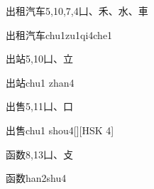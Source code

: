 \begin{entry}{出租汽车}{5,10,7,4}{⼐、⽲、⽔、⾞}
  \begin{phonetics}{出租汽车}{chu1zu1qi4che1}
  \end{phonetics}
\end{entry}

\begin{entry}{出站}{5,10}{⼐、⽴}
  \begin{phonetics}{出站}{chu1 zhan4}
  \end{phonetics}
\end{entry}

\begin{entry}{出售}{5,11}{⼐、⼝}
  \begin{phonetics}{出售}{chu1 shou4}[][HSK 4]
  \end{phonetics}
\end{entry}

\begin{entry}{函数}{8,13}{⼐、⽁}
  \begin{phonetics}{函数}{han2shu4}
  \end{phonetics}
\end{entry}


